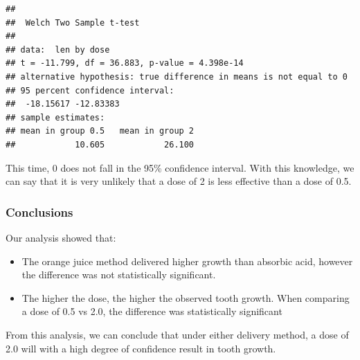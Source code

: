 \documentclass[]{article}
\providecommand{\tightlist}{%
  \setlength{\itemsep}{0pt}\setlength{\parskip}{0pt}}
\begin{document}
\begin{verbatim}
## 
##  Welch Two Sample t-test
## 
## data:  len by dose
## t = -11.799, df = 36.883, p-value = 4.398e-14
## alternative hypothesis: true difference in means is not equal to 0
## 95 percent confidence interval:
##  -18.15617 -12.83383
## sample estimates:
## mean in group 0.5   mean in group 2 
##            10.605            26.100
\end{verbatim}

This time, 0 does not fall in the 95\% confidence interval. With this
knowledge, we can say that it is very unlikely that a dose of 2 is less
effective than a dose of 0.5.

\hypertarget{conclusions}{%
\subsubsection{Conclusions}\label{conclusions}}

Our analysis showed that:

\begin{itemize}
\tightlist
\item
  The orange juice method delivered higher growth than absorbic acid,
  however the difference was not statistically significant.
\item
  The higher the dose, the higher the observed tooth growth. When
  comparing a dose of 0.5 vs 2.0, the difference was statistically
  significant
\end{itemize}

From this analysis, we can conclude that under either delivery method, a
dose of 2.0 will with a high degree of confidence result in tooth
growth.
\end{document}
